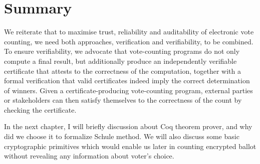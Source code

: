    
%  
  
  
  
  
    
   
\section{Summary}
We reiterate that to maximise trust, reliability and auditability of electronic vote counting, we
need both approaches, verification and verifiability, to be combined. To ensure
verifiability, we advocate that vote-counting programs
do not only compute a final result, but additionally produce an
independently verifiable certificate that attests to the correctness
of the computation, together with a formal verification that
valid certificates indeed imply the correct determination of
winners. Given a certificate-producing vote-counting program, external
parties or stakeholders can then satisfy themselves to the
correctness of the count by checking the certificate.    

In the next chapter, I will  briefly discussion about Coq theorem prover, and why did we choose it 
to formalize Schule method. We will also discuss some basic cryptographic primitives which 
would enable us later in counting encrypted ballot without revealing any information about 
voter's choice. 